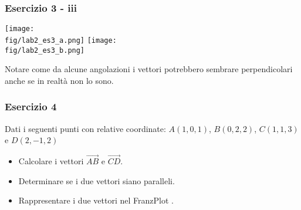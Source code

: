 \documentclass{beamer}
\newcommand{\fig}{figures} %
\newcommand{\frnzplt}{FranzPlot }
\begin{document}
\begin{frame}
\frametitle{Esercizio 3 - iii}
\vspace{-0.5cm}
\begin{center}
\texttt{[image: \\fig/lab2\_es3\_a.png]}
\texttt{[image: \\fig/lab2\_es3\_b.png]}
\end{center}
\vspace{-0.25cm}
Notare come da alcune angolazioni i vettori potrebbero sembrare perpendicolari
anche se in realt\`a non lo sono.
\end{frame}

\begin{frame}
\frametitle{Esercizio 4}
        Dati i seguenti punti con relative coordinate: $A(1, 0, 1)$, $B(0, 2, 2)$, $C(1, 1, 3)$ e $D(2, -1, 2)$
\begin{itemize}
    \item Calcolare i vettori $\overrightarrow{AB}$ e $\overrightarrow{CD}$.
    \item Determinare se i due vettori siano paralleli.
    \item Rappresentare i due vettori nel \frnzplt.
\end{itemize}
\end{frame}
\end{document}
